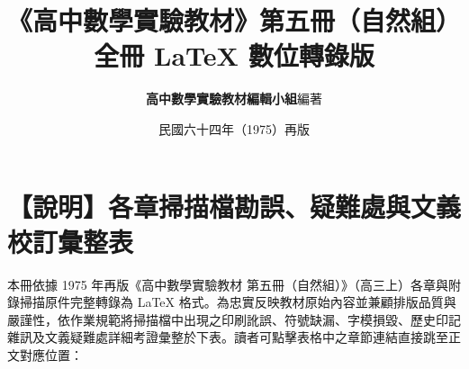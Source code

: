 \documentclass[a4paper,12pt,twoside]{article}
\title{\LARGE\textbf{《高中數學實驗教材》第五冊（自然組）}\\[0.5em] \Large\textbf{全冊 \LaTeX{} 數位轉錄版}}
\author{\textbf{高中數學實驗教材編輯小組}\quad 編著}
\date{民國六十四年（1975）再版}
\begin{document}
\maketitle
\thispagestyle{empty}

\section*{【說明】各章掃描檔勘誤、疑難處與文義校訂彙整表}
\label{sec:master_errata_notes_b5}

本冊依據 1975 年再版《高中數學實驗教材 第五冊（自然組）》（高三上）各章與附錄掃描原件完整轉錄為 \LaTeX{} 格式。為忠實反映教材原始內容並兼顧排版品質與嚴謹性，依作業規範將掃描檔中出現之印刷訛誤、符號缺漏、字模損毀、歷史印記雜訊及文義疑難處詳細考證彙整於下表。讀者可點擊表格中之章節連結直接跳至正文對應位置：
\end{document}
